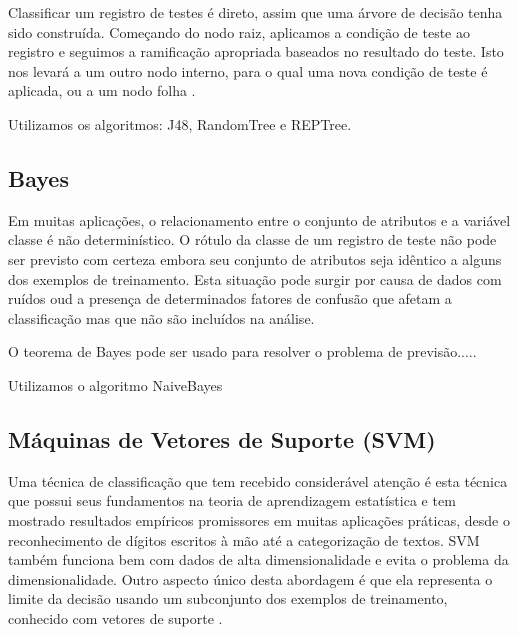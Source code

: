 \documentclass[
	12pt,				%
	openright,			%
	oneside,	
	a4paper,				%
	english,				%
	brazil				%
]{abntex2/abntex2} %
\begin{document}
		Classificar um registro de testes é direto, assim que uma árvore de decisão tenha sido construída. Começando do nodo raiz, aplicamos a condição de teste ao registro e seguimos a ramificação apropriada baseados no resultado do teste. Isto nos levará a um outro nodo interno, para o qual uma nova condição de teste é aplicada, ou a um nodo folha \cite{tan:2009}.
		
		Utilizamos os algoritmos: J48, RandomTree e REPTree.
		
	\subsection{Bayes}
	
	Em muitas aplicações, o relacionamento entre o conjunto de atributos e a variável classe é não determinístico. O rótulo da classe de um registro de teste não pode ser previsto com certeza embora seu conjunto de atributos seja idêntico a alguns dos exemplos de treinamento. Esta situação pode surgir por causa de dados com ruídos oud a presença de determinados fatores de confusão que afetam a classificação mas que não são incluídos na análise.
	
	O teorema de Bayes pode ser usado para resolver o problema de previsão.....
	
	Utilizamos o algoritmo NaiveBayes
	
	\subsection{Máquinas de Vetores de Suporte (SVM)}
	
	Uma técnica de classificação que tem recebido considerável atenção é esta técnica que possui seus fundamentos na teoria de aprendizagem estatística e tem mostrado resultados empíricos promissores em muitas aplicações práticas, desde o reconhecimento de dígitos escritos à mão até a categorização de textos. SVM também funciona bem com dados de alta dimensionalidade e evita o problema da dimensionalidade. Outro aspecto único desta abordagem é que ela representa o limite da decisão usando um subconjunto dos exemplos de treinamento, conhecido com vetores de suporte \cite{tan:2009}.
	
\end{document}
